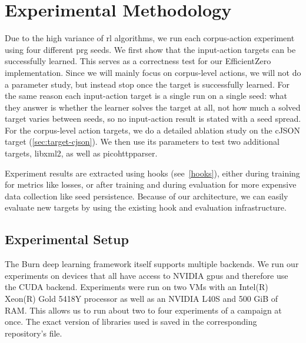 
\chapter{Experimental Methodology}\label{chap:methodology}

Due to the high variance of \gls{rl} algorithms, we run each corpus-action experiment using four
different \gls{prg} seeds.
We first show that the input-action targets can be successfully learned.
This serves as a correctness test for our EfficientZero implementation.
Since we will mainly focus on corpus-level actions, we will not do a parameter study,
but instead stop once the target is successfully learned.
For the same reason each input-action target is a single run on a single seed: what they answer
is whether the learner solves the target at all, not how much a solved target varies between
seeds, so no input-action result is stated with a seed spread.
For the corpus-level action targets, we do a detailed ablation study on the cJSON target (\cref{sec:target-cjson}).
We then use its parameters to test two additional targets, libxml2, as well as picohttpparser.

Experiment results are extracted using hooks (see~\cref{hooks}), either
during training for metrics like losses, or after training and during
evaluation for more expensive data collection like seed persistence.
Because of our architecture, we can easily evaluate new targets by using the existing
hook and evaluation infrastructure.


\section{Experimental Setup}\label{sec:methodology-setup}

The Burn deep learning framework itself supports multiple backends.
We run our experiments on devices that all have access to NVIDIA \glspl{gpu} and therefore use
the CUDA backend.
Experiments were run on two VMs with an Intel(R) Xeon(R) Gold 5418Y processor as
well as an NVIDIA L40S and 500 GiB of RAM.
This allows us to run about two to four experiments of a campaign at once.
The exact version of libraries used is saved in the corresponding repository's
 file.

